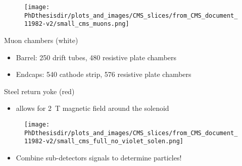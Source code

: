 \begin{frame}
\addtocounter{framenumber}{-1}
\transdissolve
\begin{minipage}[t]{.6\textwidth}
\begin{figure}
\texttt{[image: \\PhDthesisdir/plots\_and\_images/CMS\_slices/from\_CMS\_document\_11982-v2/small\_cms\_muons.png]}
\end{figure}
\end{minipage}
\hfill\begin{minipage}[t]{.35\textwidth}
\begin{block}{Muon chambers (white)}
\begin{itemize}
\item Barrel: \num{250} drift tubes, \num{480} resistive plate chambers
\item Endcaps: \num{540} cathode strip, \num{576} resistive plate chambers
\end{itemize}
\end{block}

\begin{block}{Steel return yoke (red)}
\begin{itemize}
\item allows for \SI{2}{\tesla} magnetic field around the solenoid
\end{itemize}
\end{block}
\end{minipage}
\end{frame}

\begin{frame}
\addtocounter{framenumber}{-1}
\transdissolve
\begin{minipage}[t]{.6\textwidth}
\begin{figure}
\texttt{[image: \\PhDthesisdir/plots\_and\_images/CMS\_slices/from\_CMS\_document\_11982-v2/small\_cms\_full\_no\_violet\_solen.png]}
\end{figure}
\end{minipage}
\hfill\begin{minipage}[t]{.35\textwidth}
\begin{block}{}
\begin{itemize}
\item Combine sub-detectors signals to determine particles!
\end{itemize}
\end{block}
\end{minipage}
\end{frame}